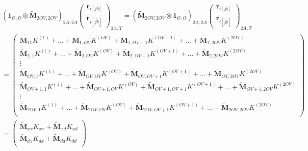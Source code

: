 \begin{align}
    &\left(\bm{1}_{O,O} \otimes \tilde{\bm{M}}_{2OV,2OV} \right)_{2A,2A} \begin{pmatrix}    
    \bm{r}_{i[jb]} \\[6pt]
\bm{\bar{r}}_{i[\bar{jb}]}
\end{pmatrix}_{2A,T}=\left( \tilde{\bm{M}}_{2OV,2OV} \otimes \bm{1}_{O,O}\right)_{2A,2A} \begin{pmatrix}    
    \bm{r}_{i[jb]} \\[6pt]
\bm{\bar{r}}_{i[\bar{jb}]}
\end{pmatrix}_{2A,T}\\
& =\begin{pmatrix}
\tilde{\bm{M}}_{11} K^{(1)} + \dots + \tilde{\bm{M}}_{1,OV} K^{(OV)} + \tilde{\bm{M}}_{1,OV+1} K^{(OV+1)}+\dots + \tilde{\bm{M}}_{1,2OV} K^{(2OV)} \\
\tilde{\bm{M}}_{2,1} K^{(1)} +  \dots + \tilde{\bm{M}}_{2,OV} K^{(OV)} + \tilde{\bm{M}}_{2,OV+1} K^{(OV+1)}+\dots + \tilde{\bm{M}}_{2,2OV} K^{(2OV)} \\[1.2em]
\vdots \\[6pt]
\tilde{\bm{M}}_{OV,1} K^{(1)} + \dots + \tilde{\bm{M}}_{OV,OV} K^{(OV)} + \tilde{\bm{M}}_{OV,OV+1} K^{(OV+1)}+\dots + \tilde{\bm{M}}_{OV,2OV} K^{(2OV)} \\[1em]
\tilde{\bm{M}}_{OV+1,1} K^{(1)} + \dots + \tilde{\bm{M}}_{OV+1,OV} K^{(OV)} + \tilde{\bm{M}}_{OV+1,OV+1} K^{(OV+1)} + \dots + \tilde{\bm{M}}_{OV+1,2OV} K^{(2OV)} \\[1em]
\vdots \\[6pt]
\tilde{\bm{M}}_{2OV,1} K^{(1)} + \dots + \tilde{\bm{M}}_{2OV,OV} K^{(OV)} + \tilde{\bm{M}}_{2OV,OV+1} K^{(OV+1)} + \dots + \tilde{\bm{M}}_{2OV,2OV} K^{(2OV)}\\
\end{pmatrix}\\
&=\begin{pmatrix}
\tilde{\bm{M}}_{xx} K_{xx} + \tilde{\bm{M}}_{xd} K_{xd} \\
\tilde{\bm{M}}_{dx} K_{dx} + \tilde{\bm{M}}_{dd} K_{dd} \\
\end{pmatrix}
\end{align}


